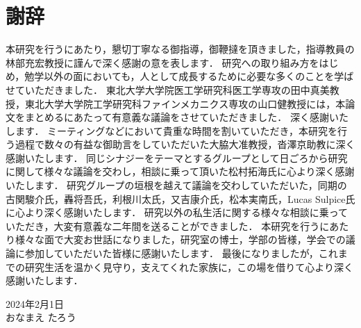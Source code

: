 \cleardoublepage %
\chapter*{謝辞}
本研究を行うにあたり，懇切丁寧なる御指導，御鞭撻を頂きました，指導教員の林部充宏教授に謹んで深く感謝の意を表します．
研究への取り組み方をはじめ，勉学以外の面においても，人として成長するために必要な多くのことを学ばせていただきました．
東北大学大学院医工学研究科医工学専攻の田中真美教授，東北大学大学院工学研究科ファインメカニクス専攻の山口健教授には，本論文をまとめるにあたって有意義な議論をさせていただきました．
深く感謝いたします．
ミーティングなどにおいて貴重な時間を割いていただき，本研究を行う過程で数々の有益な御助言をしていただいた大脇大准教授，沓澤京助教に深く感謝いたします．
同じシナジーをテーマとするグループとして日ごろから研究に関して様々な議論を交わし，相談に乗って頂いた松村拓海氏に心より深く感謝いたします．
研究グループの垣根を越えて議論を交わしていただいた，同期の古関駿介氏，轟将吾氏，利根川太氏，又吉康介氏，松本実南氏，Lucas Sulpice氏に心より深く感謝いたします．
研究以外の私生活に関する様々な相談に乗っていただき，大変有意義な二年間を送ることができました．
本研究を行うにあたり様々な面で大変お世話になりました，研究室の博士，学部の皆様，学会での議論に参加していただいた皆様に感謝いたします．
最後になりましたが，これまでの研究生活を温かく見守り，支えてくれた家族に，この場を借りて心より深く感謝いたします．

\begin{flushright}
2024年2月1日\\
おなまえ たろう
\end{flushright}
